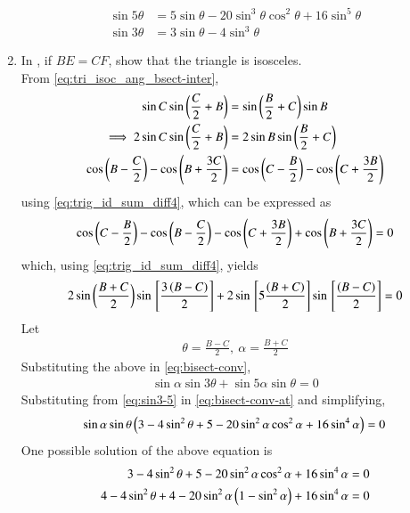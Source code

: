 \begin{enumerate}[label=\thesubsection.\arabic*.,ref=\thesubsection.\theenumi]
\begin{align}
\sin 5\theta &= 5\sin \theta - 20\sin^3 \theta \cos^2 \theta + 16\sin^5 \theta \\
\sin 3\theta &= 3\sin \theta - 4\sin^3 \theta
\label{eq:sin3-5}
\end{align}
\item 
	In , if $BE = CF$, show that the triangle is isosceles.
	\\
	\solution
	From \eqref{eq:tri_isoc_ang_bsect-inter},
\begin{align}
	\sin C
\sin \left(\frac{C}{2}+B\right)
	&=
\sin \left(\frac{B}{2}+C\right)
\sin B
\\
	\implies 2\sin C
\sin \left(\frac{C}{2}+B\right)
	&=
2\sin B
\sin \left(\frac{B}{2}+C\right)
\\
\cos \left(B - \frac{C}{2}\right)
-\cos \left(B + \frac{3C}{2}\right)
	&=
\cos \left(C - \frac{B}{2}\right)
-\cos \left(C + \frac{3B}{2}\right)
\end{align}
using \eqref{eq:trig_id_sum_diff4},
which can be expressed as
\begin{align}
\cos \left(C - \frac{B}{2}\right)
-
\cos \left(B - \frac{C}{2}\right)
-\cos \left(C + \frac{3B}{2}\right)
+
	\cos \left(B + \frac{3C}{2}\right)
	=0
\end{align}
which, using \eqref{eq:trig_id_sum_diff4},
yields
\begin{align}
 2\sin \left( \frac{B +C}{2}\right)
	\sin {}\left[ \frac{3\left(B -C\right)}{2}\right]
	+ 2\sin {}\left[ 5\frac{\left(B +C\right)}{2}\right]
	\sin {}\left[ \frac{\left(B -C\right)}{2}\right]
	=0
\label{eq:bisect-conv}
\end{align}
Let
\begin{align}
	\theta = \frac{B -C}{2},\
	\alpha= \frac{B +C}{2}
\end{align}
Substituting the above in 
\eqref{eq:bisect-conv},
\begin{align}
 \sin \alpha \sin 3\theta
	+ \sin 5 \alpha \sin \theta = 0
\label{eq:bisect-conv-at}
\end{align}
Substituting
from \eqref{eq:sin3-5}
in \eqref{eq:bisect-conv-at} and simplifying,
\begin{align}
 \sin \alpha \sin \theta
	\left(3- 4\sin^2 \theta + 5- 20\sin^2 \alpha \cos^2 \alpha + 16\sin^4\alpha \right) = 0
\end{align}
One possible solution of the above equation is
\begin{align}
	3- 4\sin^2 \theta + 5- 20\sin^2 \alpha \cos^2 \alpha + 16\sin^4\alpha  = 0
	\\
	4- 4\sin^2 \theta + 4- 20\sin^2 \alpha \left(1-\sin^2 \alpha\right) + 16\sin^4\alpha  = 0
\end{align}

\end{enumerate}

